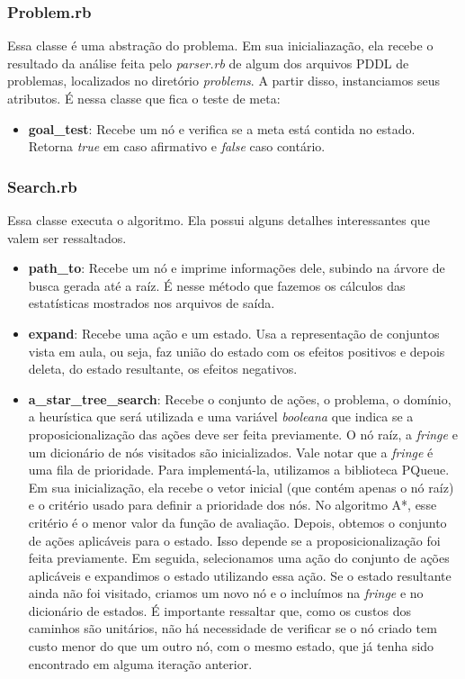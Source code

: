 \documentclass[12pt,a4paper]{article}
\begin{document}
\subsubsection{Problem.rb}\label{implementacao:detalhes:problema}
Essa classe é uma abstração do problema. Em sua inicialiazação, ela recebe o resultado da análise feita pelo \textit{parser.rb} de algum dos arquivos PDDL de problemas, localizados no diretório \textit{problems}. A partir disso, instanciamos seus atributos. É nessa classe que fica o teste de meta:
    \begin{itemize}
        \item \textbf{goal\_test}: Recebe um nó e verifica se a meta está contida no estado. Retorna \textit{true} em caso afirmativo e \textit{false} caso contário.
    \end{itemize}

\subsubsection{Search.rb}\label{implementacao:detalhes:busca}
Essa classe executa o algoritmo. Ela possui alguns detalhes interessantes que valem ser ressaltados.
    \begin{itemize}
        \item \textbf{path\_to}: Recebe um nó e imprime informações dele, subindo na árvore de busca gerada até a raíz. É nesse método que fazemos os cálculos das estatísticas mostrados nos arquivos de saída.
        \item \textbf{expand}: Recebe uma ação e um estado. Usa a representação de conjuntos vista em aula, ou seja, faz união do estado com os efeitos positivos e depois deleta, do estado resultante, os efeitos negativos.
        \item \textbf{a\_star\_tree\_search}: Recebe o conjunto de ações, o problema, o domínio, a heurística que será utilizada e uma variável \textit{booleana} que indica se a proposicionalização das ações deve ser feita previamente. O nó raíz, a \textit{fringe} e um dicionário de nós visitados são inicializados. Vale notar que a \textit{fringe} é uma fila de prioridade. Para implementá-la, utilizamos a biblioteca PQueue. Em sua inicialização, ela recebe o vetor inicial (que contém apenas o nó raíz) e o critério usado para definir a prioridade dos nós. No algoritmo A*, esse critério é o menor valor da função de avaliação.
        Depois, obtemos o conjunto de ações aplicáveis para o estado. Isso depende se a proposicionalização foi feita previamente.
        Em seguida, selecionamos uma ação do conjunto de ações aplicáveis e expandimos o estado utilizando essa ação. Se o estado resultante ainda não foi visitado, criamos um novo nó e o incluímos na \textit{fringe} e no dicionário de estados. É importante ressaltar que, como os custos dos caminhos são unitários, não há necessidade de verificar se o nó criado tem custo menor do que um outro nó, com o mesmo estado, que já tenha sido encontrado em alguma iteração anterior.
    \end{itemize}
\end{document}
